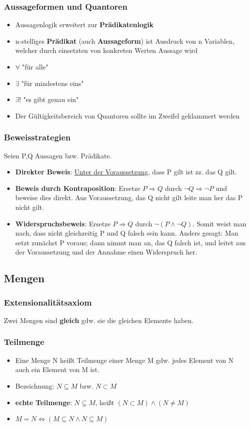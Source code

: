 \documentclass[titlepage]{article}
\newcommand{\1}{\mathbb{1}}
\newcommand{\0}{\mathbb{0}}
\begin{document}
				\subsubsection{Aussageformen und Quantoren}
					\begin{itemize}
						\item Aussagenlogik erweitert zur \textbf{Prädikatenlogik}
						\item n-stelliges \textbf{Prädikat} (auch \textbf{Aussageform}) ist Ausdruck von n Variablen, welcher durch einsetzten von konkreten Werten Aussage wird
						\item $\forall$ "für alle"
						\item $\exists$ "für mindestens eins"
						\item $\exists$! "es gibt genau ein"
						\item Der Gültigkeitsbereich von Quantoren sollte im Zweifel geklammert werden
					\end{itemize}
				\subsubsection{Beweisstrategien}
					Seien P,Q Aussagen bzw. Prädikate.
					\begin{itemize}
						\item \textbf{Direkter Beweis}: \underline{Unter der Voraussetzung}, dass P gilt ist zz. das Q gilt.
						\item \textbf{Beweis durch Kontraposition}: Ersetze $P\Rightarrow Q$ durch $\neg Q\Rightarrow\neg P$ und beweise dies direkt. Aus Voraussetzung, das Q nicht gilt leite man her das P nicht gilt.
						\item \textbf{Widerspruchsbeweis}: Ersetze $P\Rightarrow Q$ durch $\neg(P\wedge\neg Q)$. Somit weist man nach, dass nicht gleichzeitig P und Q falsch sein kann. Anders gesagt: Man setzt zunächst P voraus; dann nimmt man an, das Q falsch ist, und leitet aus der Voraussetzung und der Annahme einen Widerspruch her.
					\end{itemize}
			\subsection{Mengen}
				\subsubsection{Extensionalitätsaxiom}
					Zwei Mengen sind \textbf{gleich} gdw. sie die gleichen Elemente haben.
				\subsubsection{Teilmenge}
					\begin{itemize}
						\item Eine Menge N heißt Teilmenge einer Menge M gdw. jedes Element von N auch ein Element von M ist.
						\item Bezeichnung: $N\subseteq M$ bzw. $N\subset M$
						\item \textbf{echte Teilmenge}: $N\subsetneq M$, heißt $(N\subset M)\wedge(N\neq M)$
						\item $M=N\Longleftrightarrow(M\subseteq N\wedge N\subseteq M)$
					\end{itemize}
\end{document}
